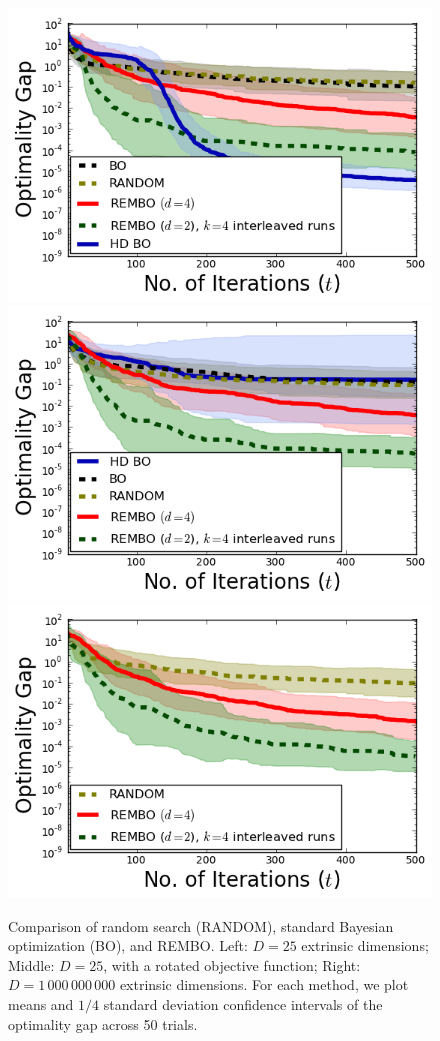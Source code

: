 \documentclass{article}
\begin{document}
\begin{figure}[t!]
\centering
  \includegraphics[scale=0.4]{figures/branin_dis_25.png}
  \includegraphics[scale=0.4]{figures/branin_dis_rot.png}
  \includegraphics[scale=0.4]{figures/branin_dis_1b.png}
  \caption{Comparison of random search (RANDOM), standard Bayesian optimization (BO), and REMBO.
Left: $D=25$ extrinsic dimensions; Middle: $D=25$, with a rotated objective function; Right: $D=1\,000\,000\,000$ extrinsic dimensions. For each method, we plot means and $1/4$ standard deviation confidence intervals of the optimality gap across 50 trials.}
  \label{fig:standard}
  \vspace{-1.0em}
\end{figure}
\end{document}
